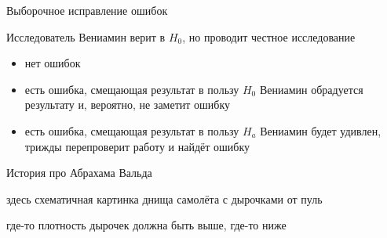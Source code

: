 \documentclass[ignorenonframetext,]{beamer}
\begin{document}
\begin{frame}{Выборочное исправление ошибок}

Исследователь Вениамин верит в \(H_0\), но проводит честное исследование

\begin{itemize}
\itemsep1pt\parskip0pt
\item
  нет ошибок
\item
  есть ошибка, смещающая результат в пользу \(H_0\) Вениамин обрадуется
  результату и, вероятно, не заметит ошибку
\item
  есть ошибка, смещающая результат в пользу \(H_a\) Вениамин будет
  удивлен, трижды перепроверит работу и найдёт ошибку
\end{itemize}

\end{frame}

\begin{frame}{История про Абрахама Вальда}

здесь схематичная картинка днища самолёта с дырочками от пуль

где-то плотность дырочек должна быть выше, где-то ниже

\end{frame}
\end{document}
